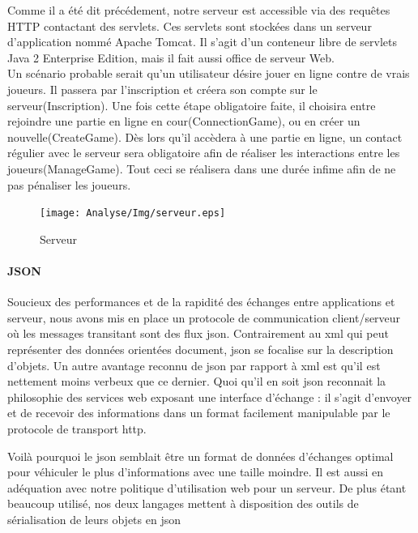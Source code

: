 		
		Comme il a été dit précédement, notre serveur est accessible via des requêtes
		HTTP contactant des servlets. Ces servlets sont stockées dans un serveur
		d'application nommé Apache Tomcat. Il s'agit d'un conteneur libre de
		servlets Java 2 Enterprise Edition, mais il fait aussi office de serveur
		Web.\\
		Un scénario probable serait qu'un utilisateur désire jouer
		en ligne contre de vrais joueurs. 
		Il passera par l'inscription et créera son compte sur le
		serveur(Inscription). Une fois cette étape obligatoire faite, il choisira
		entre rejoindre une partie en ligne en cour(ConnectionGame), ou en créer un nouvelle(CreateGame).
		Dès lors qu'il accèdera à une partie en
		ligne, un contact régulier avec le serveur sera obligatoire afin de réaliser
		les interactions entre les joueurs(ManageGame). Tout ceci se
		réalisera dans une durée infime afin de ne pas pénaliser les joueurs.	
		
		\begin{figure}
			\texttt{[image: Analyse/Img/serveur.eps]}
			 \caption {Serveur}
		\end{figure}
		
		\newpage
		
		
	\paragraph{JSON\\}	
	
		Soucieux des performances et de la rapidité des échanges entre applications et
		serveur, nous avons mis en place un protocole de communication client/serveur
		où les messages transitant sont des flux \gls{json}. 	
		Contrairement au \gls{xml} qui peut représenter des données orientées document,
		\gls{json} se focalise sur la description d’objets.
		Un autre avantage reconnu de \gls{json} par rapport à \gls{xml} est qu’il est nettement
		moins verbeux que ce dernier.
		Quoi qu’il en soit \gls{json} reconnait la philosophie des services web exposant
		une interface d’échange : il s’agit
		d’envoyer et de recevoir des informations dans un format facilement manipulable par
		le protocole de transport \gls{http}.
		
		
		Voilà pourquoi le \gls{json} semblait être un format de données d'échanges optimal
		pour véhiculer le plus d'informations avec une taille moindre. Il est aussi en
		adéquation avec notre politique d'utilisation web pour un serveur.
		De plus étant beaucoup utilisé, nos deux
		langages mettent à disposition des outils de sérialisation de leurs objets en \gls{json}
		
